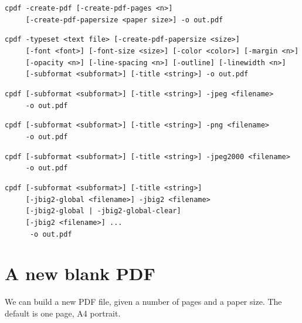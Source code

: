 \documentclass{book}
\begin{document}
  {\small\begin{framed}
  \noindent\verb!cpdf -create-pdf [-create-pdf-pages <n>]!\\
  \noindent\verb!     [-create-pdf-papersize <paper size>] -o out.pdf!


  \vspace{1.5mm}
  \noindent\verb!cpdf -typeset <text file> [-create-pdf-papersize <size>]!\\
  \noindent\verb!     [-font <font>] [-font-size <size>] [-color <color>] [-margin <n>]!\\
  \noindent\verb!     [-opacity <n>] [-line-spacing <n>] [-outline] [-linewidth <n>]!\\
  \noindent\verb!     [-subformat <subformat>] [-title <string>] -o out.pdf!

  \vspace{1.5mm}
  \noindent\verb!cpdf [-subformat <subformat>] [-title <string>] -jpeg <filename>!\\
  \noindent\verb!     -o out.pdf!

  \vspace{1.5mm}
  \noindent\verb!cpdf [-subformat <subformat>] [-title <string>] -png <filename>!\\
  \noindent\verb!     -o out.pdf!

  \vspace{1.5mm}
  \noindent\verb!cpdf [-subformat <subformat>] [-title <string>] -jpeg2000 <filename>!\\
  \noindent\verb!     -o out.pdf!

  \vspace{1.5mm}
  \noindent\verb!cpdf [-subformat <subformat>] [-title <string>]!\\
  \noindent\verb!     [-jbig2-global <filename>] -jbig2 <filename>!\\
  \noindent\verb!     [-jbig2-global | -jbig2-global-clear]!\\
  \noindent\verb!     [-jbig2 <filename>] ...!\\
  \noindent\verb!      -o out.pdf!
  \end{framed}}

\section{A new blank PDF}

We can build a new PDF file, given a number of pages and a paper size. The default is one page, A4 portrait.
\end{document}
